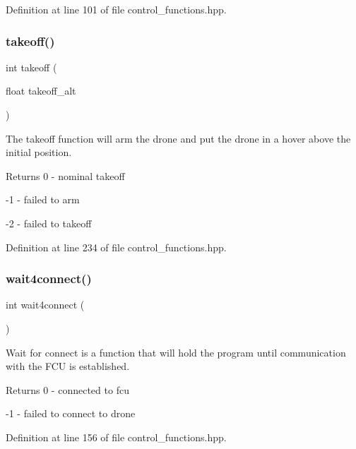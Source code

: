 Definition at line 101 of file control\+\_\+functions.\+hpp.

\mbox{\label{group__control__functions_gac0aa671c99c09687515ec5bb8891c7d2}} 
\subsubsection{\texorpdfstring{takeoff()}{takeoff()}}
{\footnotesize\ttfamily int takeoff (\begin{DoxyParamCaption}\item[{float}]{takeoff\+\_\+alt }\end{DoxyParamCaption})}

The takeoff function will arm the drone and put the drone in a hover above the initial position. \begin{DoxyReturn}{Returns}
0 -\/ nominal takeoff 

-\/1 -\/ failed to arm 

-\/2 -\/ failed to takeoff 
\end{DoxyReturn}


Definition at line 234 of file control\+\_\+functions.\+hpp.

\mbox{\label{group__control__functions_ga1921a30d419eb397f7e40875217b45d1}} 
\subsubsection{\texorpdfstring{wait4connect()}{wait4connect()}}
{\footnotesize\ttfamily int wait4connect (\begin{DoxyParamCaption}{ }\end{DoxyParamCaption})}

Wait for connect is a function that will hold the program until communication with the F\+CU is established. \begin{DoxyReturn}{Returns}
0 -\/ connected to fcu 

-\/1 -\/ failed to connect to drone 
\end{DoxyReturn}


Definition at line 156 of file control\+\_\+functions.\+hpp.

